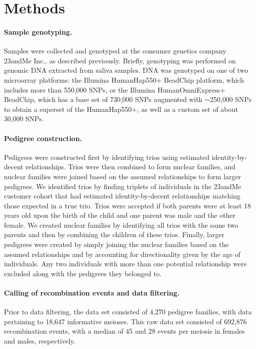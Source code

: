 \section{Methods}

\paragraph{Sample genotyping.} Samples were collected and genotyped at the consumer
genetics company 23andMe Inc., as described previously\cite{Eriksson2010}. Briefly, genotyping was
performed on genomic DNA extracted from saliva samples. DNA was genotyped
on one of two microarray platforms: the Illumina HumanHap550+ BeadChip
platform, which includes more than 550,000 SNPs, or the Illumina
HumanOmniExpress+ BeadChip, which has a base set of 730,000 SNPs
augmented with $\sim$250,000 SNPs to obtain a superset of the HumanHap550+,
as well as a custom set of about 30,000 SNPs.

\paragraph{Pedigree construction.} Pedigrees were constructed first by identifying trios using
estimated identity-by-decent relationships. Trios were then combined to form
nuclear families, and nuclear families were joined based on the assumed
relationships to form larger pedigrees. We identified trios by finding triplets of
individuals in the 23andMe customer cohort that had estimated identity-by-decent
relationships matching those expected in a true trio. Trios were accepted if both
parents were at least 18 years old upon the birth of the child and one parent was
male and the other female. We created nuclear families by identifying all trios with
the same two parents and then by combining the children of these trios. Finally,
larger pedigrees were created by simply joining the nuclear families based on the
assumed relationships and by accounting for directionality given by the age of
individuals. Any two individuals with more than one potential relationship were
excluded along with the pedigrees they belonged to.

\paragraph{Calling of recombination events and data filtering.} Prior to data filtering,
the data set consisted of 4,270 pedigree families, with data pertaining to 18,647
informative meioses. This raw data set consisted of 692,876 recombination events,
with a median of 45 and 28 events per meiosis in females and males, respectively.

